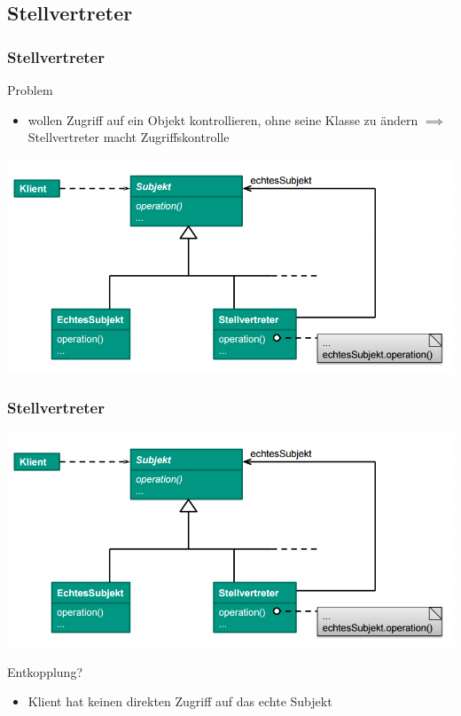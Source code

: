 \documentclass[18pt]{beamer}
\begin{document}
	\subsection{Stellvertreter}
	\begin{frame}
		\frametitle{Stellvertreter}
		\begin{block}{Problem}
			\begin{itemize}
				\item wollen Zugriff auf ein Objekt kontrollieren, ohne seine Klasse zu ändern \linebreak \pause $\implies$ Stellvertreter macht Zugriffskontrolle
			\end{itemize}
		\end{block}
		\pause
		\centering
		\includegraphics[scale=0.4]{./pics/tut3/prox.png}
	\end{frame}

	\begin{frame}
		\frametitle{Stellvertreter}
		\centering
		\includegraphics[scale=0.4]{./pics/tut3/prox.png}
		\begin{block}{Entkopplung?}
			\begin{itemize}
				\pause 
				\item Klient hat keinen direkten Zugriff auf das echte Subjekt
			\end{itemize}
		\end{block}
	\end{frame}
\end{document}
